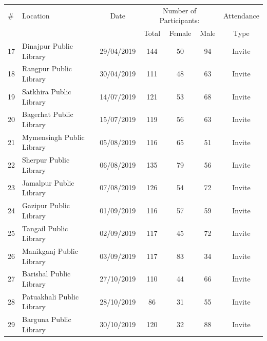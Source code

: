 \documentclass[12pt]{report} %
\begin{document}
\begin{table}[ht]
\ContinuedFloat
\label{tab:continued} 
\centering %
\begin{tabular}{l l c c c c c} %
\hline %
\# & Location & Date & \multicolumn{3}{c}{Number of Participants:} & Attendance\\ %
&&& Total & Female & Male & Type\\ %
\hline
\hline
17 & Dinajpur Public Library & 29/04/2019 & 144   & 50  & 94  & Invite\\
18 & Rangpur Public Library & 30/04/2019 & 111  & 48  & 63 & Invite\\
19 & Satkhira Public Library & 14/07/2019 & 121  & 53  & 68 & Invite\\
20 & Bagerhat Public Library & 15/07/2019 & 119  & 56  & 63 & Invite\\
21 & Mymensingh Public Library & 05/08/2019 & 116  & 65 & 51 & Invite\\
22 & Sherpur Public Library & 06/08/2019 & 135  & 79  & 56 & Invite\\
23 & Jamalpur Public Library & 07/08/2019 & 126  & 54  & 72 & Invite\\
24 & Gazipur Public Library & 01/09/2019 & 116 & 57 & 59 & Invite \\
25 & Tangail Public Library & 02/09/2019 & 117 & 45 & 72 & Invite \\
26 & Manikganj Public Library & 03/09/2019 & 117 & 83 & 34 & Invite \\
27 & Barishal Public Library & 27/10/2019 & 110 & 44 & 66& Invite \\
28 & Patuakhali Public Library & 28/10/2019 & 86 & 31 & 55 & Invite \\
29 & Barguna Public Library & 30/10/2019 & 120 & 32 & 88 & Invite \\

\end{tabular}
\end{table}
\end{document}
